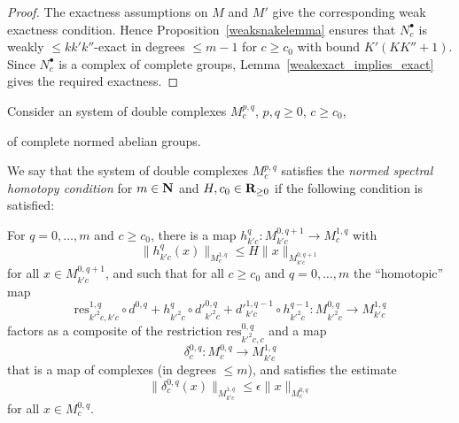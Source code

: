 \begin{proof}
  The exactness assumptions on $M$ and $M'$ give the corresponding
  weak exactness condition. Hence Proposition~\ref{weaksnakelemma}
  ensures that $N^\bullet_c$ is weakly $\leq kk'k''$-exact in degrees
  $\leq m-1$ for $c\geq c_0$ with bound $K'(KK'' + 1)$.
  Since $N^\bullet_c$ is a complex of complete groups,
  Lemma~\ref{weakexact_implies_exact} gives the required exactness.
\end{proof}

Consider an system of double complexes $M^{p,q}_c$, $p,q\geq 0$, $c\geq c_0$,
\begin{center}
\end{center}
of complete normed abelian groups.

\begin{definition}
  \label{spectral-htpy}
  \leanok
  We say that the system of double complexes $M^{p,q}_c$
  satisfies the \emph{normed spectral homotopy condition}
  for $m \in \mathbf{N}$ and $H, c_0 \in \mathbf{R}_{\ge 0}$
  if the following condition is satisfied:

  For $q=0,\ldots,m$ and $c\geq c_0$,
  there is a map $h^q_{k'c} \colon M^{0,q+1}_{k'c}\to M^{1,q}_c$ with
  \[
    \|h^q_{k'c}(x)\|_{M^{1,q}_c} \leq H\|x\|_{M^{0,q+1}_{k'c}}
  \]
  for all $x\in M^{0,q+1}_{k'c}$,
  and such that for all $c\geq c_0$ and $q=0,\ldots,m$ the ``homotopic'' map
  \[
    \mathrm{res}_{k'^2c,k'c}^{1,q}\circ d^{0,q} +
    h^q_{k'^2c}\circ d'^{0,q}_{k'^2c} +
    d'^{1,q-1}_{k'c}\circ h^{q-1}_{k'^2c} \colon
      M^{0,q}_{k'^2c}\to M^{1,q}_{k'c}
  \]
  factors as a composite of the restriction $\mathrm{res}_{k'^2c,c}^{0,q}$ and a map
  \[
    \delta^{0,q}_c \colon M^{0,q}_c\to M^{1,q}_{k'c}
  \]
  that is a map of complexes (in degrees $\leq m$), and satisfies the estimate
  \begin{equation}\label{eq:homotopicmapsmall}
  \|\delta^{0,q}_c(x)\|_{M^{1,q}_{k'c}}\leq \epsilon \|x\|_{M^{0,q}_c}
  \end{equation}
  for all $x\in M^{0,q}_c$.
\end{definition}

